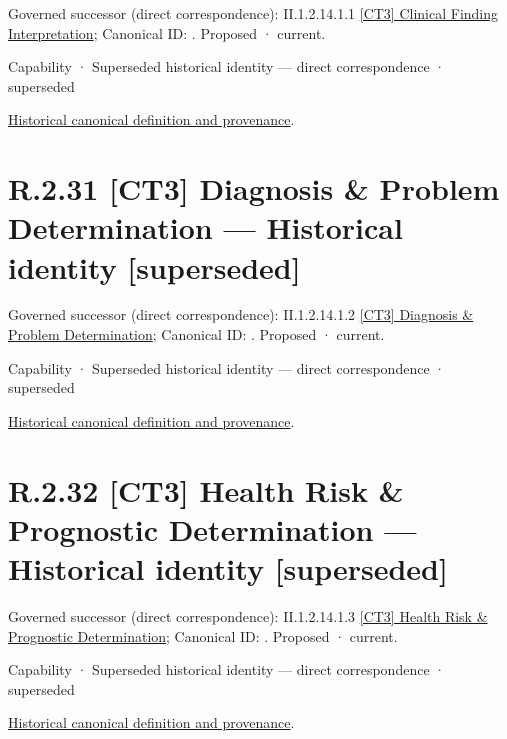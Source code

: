 {\small Governed successor (direct correspondence): II.1.2.14.1.1 \hyperref[element:deb78ba3b1514074a8ca5bc5da0673f5]{[CT3] Clinical Finding Interpretation}; Canonical ID: \texttt{}. Proposed · current.}\par
\label{element:cf8ddfca7a8e4ed893ec39b795200d77}
{\small Capability · Superseded historical identity — direct correspondence · superseded}\par
\href{../../../../continuum/strategy/capability/cf8ddfca7a8e4ed893ec39b795200d77.md}{Historical canonical definition and provenance}.\par
\section*{R.2.31 [CT3] Diagnosis \& Problem Determination — Historical identity [superseded]}
\label{navigation:R.2.31}

{\small Governed successor (direct correspondence): II.1.2.14.1.2 \hyperref[element:d965032637e64275b7a61c0413834590]{[CT3] Diagnosis \& Problem Determination}; Canonical ID: \texttt{}. Proposed · current.}\par
\label{element:e575c583783546ef85cf898523d18797}
{\small Capability · Superseded historical identity — direct correspondence · superseded}\par
\href{../../../../continuum/strategy/capability/e575c583783546ef85cf898523d18797.md}{Historical canonical definition and provenance}.\par
\section*{R.2.32 [CT3] Health Risk \& Prognostic Determination — Historical identity [superseded]}
\label{navigation:R.2.32}

{\small Governed successor (direct correspondence): II.1.2.14.1.3 \hyperref[element:5bba0ea969814b5fa7ad11b67ab40a0c]{[CT3] Health Risk \& Prognostic Determination}; Canonical ID: \texttt{}. Proposed · current.}\par
\label{element:3215f0b0e1ce45e8ab16dae272ea6fe7}
{\small Capability · Superseded historical identity — direct correspondence · superseded}\par
\href{../../../../continuum/strategy/capability/3215f0b0e1ce45e8ab16dae272ea6fe7.md}{Historical canonical definition and provenance}.\par
